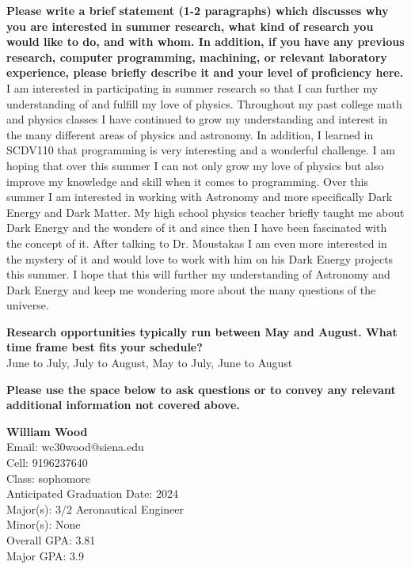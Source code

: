 \documentclass[12pt,preprint]{aastex}
\begin{document}
\vspace*{3mm}
{\bf Please write a brief statement (1-2 paragraphs) which discusses why you are interested in summer research, what kind of research you would like to do, and with whom.  In addition, if you have any previous research, computer programming, machining, or relevant laboratory experience, please briefly describe it and your level of proficiency here.}\\
I am interested in participating in summer research so that I can further my understanding of and fulfill my love of physics. Throughout my past college math and physics classes I have continued to grow my understanding and interest in the many different areas of physics and astronomy. In addition, I learned in SCDV110 that programming is very interesting and a wonderful challenge. I am hoping that over this summer I can not only grow my love of physics but also improve my knowledge and skill when it comes to programming. Over this summer I am interested in working with Astronomy and more specifically Dark Energy and Dark Matter. My high school physics teacher briefly taught me about Dark Energy and the wonders of it and since then I have been fascinated with the concept of it. After talking to Dr. Moustakas I am even more interested in the mystery of it and would love to work with him on his Dark Energy projects this summer. I hope that this will further my understanding of Astronomy and Dark Energy and keep me wondering more about the many questions of the universe.

\vspace*{3mm}
{\bf Research opportunities typically run between May and August.  What time frame best fits your schedule?}\\
June to July, July to August, May to July, June to August

\vspace*{3mm}
{\bf Please use the space below to ask questions or to convey any relevant additional information not covered above.}\\
\vspace*{3mm}

\vspace*{3mm}
\clearpage
{\large {\bf William Wood}}\\
Email: wc30wood@siena.edu\\
Cell: 9196237640\\
Class: sophomore\\
Anticipated Graduation Date: 2024\\
Major(s): 3/2 Aeronautical Engineer\\
Minor(s): None\\
Overall GPA: 3.81\\
Major GPA: 3.9\\
\end{document}
